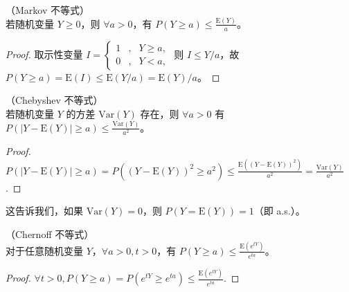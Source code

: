 \documentclass[../main.tex]{subfiles}
\begin{document}
\begin{theorem}\label{thm:5.1.1}
    （Markov 不等式）\\
    若随机变量 $Y\geq 0$，则 $\forall a>0$，有 $P(Y\geq a)\leq \frac{\mathrm E(Y)}a$。
\end{theorem}

\begin{proof}
    取示性变量 $I=\left\{
        \begin{aligned}
            1 & , & Y\geq a, \\
            0 & , & Y<a,
        \end{aligned}\right.$
    则 $I\leq Y/a$，故 $P(Y\geq a)=\mathrm E(I)\leq \mathrm E(Y/a)=\mathrm E(Y)/a$。
\end{proof}



\begin{theorem}\label{thm:5.1.2}
    （Chebyshev 不等式）\\
    若随机变量 $Y$ 的方差 $\mathrm{Var}(Y)$ 存在，则 $\forall a>0$ 有 $P(|Y-\mathrm E(Y)|\geq a)\leq \frac{\mathrm{Var}(Y)}{a^2}$。
\end{theorem}

\begin{proof}
    $P(|Y-\mathrm E(Y)|\geq a)=P((Y-\mathrm E(Y))^2\geq a^2)\leq \frac{\mathrm E((Y-\mathrm E(Y))^2)}{a^2}=\frac{\mathrm{Var}(Y)}{a^2}$.
\end{proof}

这告诉我们，如果 $\mathrm{Var}(Y)=0$，则 $P(Y=\mathrm E(Y))=1$（即 a.s.）。

\begin{theorem}\label{thm:5.1.3}
    （Chernoff 不等式）\\
    对于任意随机变量 $Y$，$\forall a>0,t>0$，有 $P(Y\geq a)\leq\frac{\mathrm E(e^{tY})}{e^{ta}}$。
\end{theorem}

\begin{proof}
    $\forall t>0,P(Y\geq a)=P(e^{tY}\geq e^{ta})\leq\frac{\mathrm E(e^{tY})}{e^{ta}}.$
\end{proof}
\end{document}

